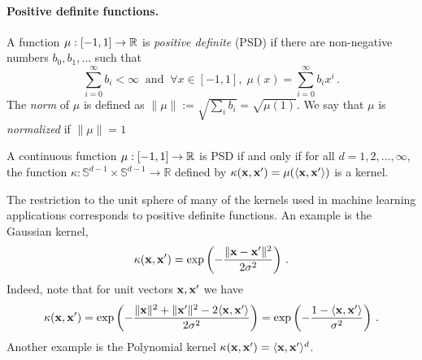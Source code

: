 \paragraph*{Positive definite functions.} A function
$\mu:[-1,1]\to{\mathbb R}$ is {\em positive definite} (PSD) if there are
non-negative numbers $b_0,b_1,\ldots$ such that
$$\sum_{i=0}^\infty b_i < \infty ~ \mbox{ and } ~
  \forall x\in [-1,1],\; \mu(x)=\sum_{i=0}^\infty b_ix^i \, .$$
The {\em norm} of $\mu$ is defined as
$\|\mu\|:=\sqrt{\sum_{i} b_i}=\sqrt{\mu(1)}$.
We say that $\mu$ is {\em normalized} if $\|\mu\|= 1$
\begin{theorem}\label{thm:psd_func}
%
A continuous function $\mu:[-1,1]\to{\mathbb R}$ is PSD if and only if for all
$d=1,2,\ldots,\infty$, the function
$\kappa:\mathbb{S}^{d-1}\times\mathbb{S}^{d-1}\to\mathbb{R}$ defined by
$\kappa({\mathbf x},{\mathbf x}')=\mu(\langle {\mathbf x},{\mathbf x}' \rangle)$ is a kernel.
%
\end{theorem}
\noindent The restriction to the unit sphere of many of the kernels used in
machine learning applications corresponds to positive definite functions. An
example is the Gaussian kernel,
$$\kappa({\mathbf x},{\mathbf x}') = \exp\left(-\frac{\|{\mathbf x}-{\mathbf x}'\|^2}{2\sigma^2}\right) \,.$$
Indeed, note that for unit vectors ${\mathbf x},{\mathbf x}'$ we have
$$\kappa({\mathbf x},{\mathbf x}')
  = \exp\left(-\frac{\|{\mathbf x}\|^2+\|{\mathbf x}'\|^2-2\langle {\mathbf x},{\mathbf x}' \rangle}{2\sigma^2}\right)
  = \exp\left(-\frac{1-\langle {\mathbf x},{\mathbf x}' \rangle}{\sigma^2}\right) \,.$$
Another example is the Polynomial kernel
$\kappa({\mathbf x},{\mathbf x}')=\langle {\mathbf x},{\mathbf x}' \rangle^d$.


